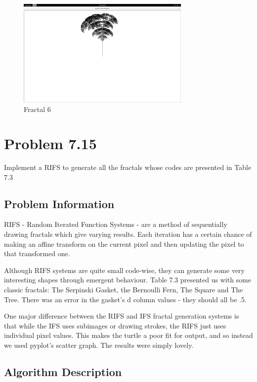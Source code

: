 \begin{figure}[tbh]
\begin{center}
\includegraphics[width=0.75\textwidth]{fractal6.png}
\end{center}
\caption{Fractal 6\label{fig:gprun}}
\end{figure}
	


\section{Problem 7.15}

Implement a RIFS to generate all the fractals whose codes are presented in Table 7.3

\subsection{Problem Information}

RIFS - Random Iterated Function Systems - are a method of sequentially drawing fractals which give varying results.  Each iteration has a certain chance of making an affine transform on the current pixel and then updating the pixel to that transformed one.

Although RIFS systems are quite small code-wise, they can generate some very interesting shapes through emergent behaviour.  Table 7.3 presented us with some classic fractals: The Serpinski Gasket, the Bernoulli Fern, The Square and The Tree.  There was an error in the gasket's d column values - they should all be .5.

One major difference between the RIFS and IFS fractal generation systems is that while the IFS uses subimages or drawing strokes, the RIFS just uses individual pixel values.  This makes the turtle a poor fit for output, and so instead we used pyplot's scatter graph.  The results were simply lovely.

\subsection{Algorithm Description}

